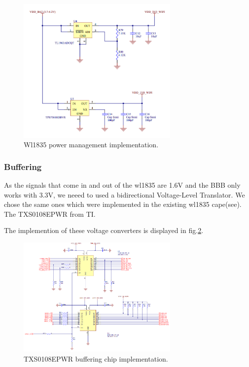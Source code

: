 \begin{figure}[!ht]
    \centering
    \includegraphics[width=0.7\textwidth,keepaspectratio]{chap/hardFig/wl1835_power_sch}
    \caption{Wl1835 power management implementation.}
    \label{fig:power management}
\end{figure}

\subsubsection{Buffering}
As the signals that come in and out of the wl1835 are 1.6V and the BBB only works with 3.3V, we neeed to used a bidirectional Voltage-Level Translator. We chose the same ones which were implemented in the existing wl1835 cape(see). The TXS0108EPWR from TI.

The implemention of these voltage converters is displayed in fig.\ref{fig:buffering chip}.

\begin{figure}[!ht]
    \centering
    \includegraphics[width=0.7\textwidth,keepaspectratio]{chap/hardFig/wl_1835_buffer_sch}
    \caption{TXS0108EPWR buffering chip implementation.}
    \label{fig:buffering chip}
\end{figure}
